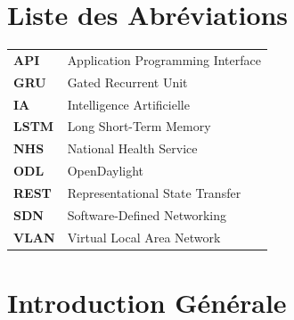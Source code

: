 \documentclass[12pt,a4paper]{article}
\begin{document}
\newpage
\section*{Liste des Abréviations}

\begin{tabular}{ll}
\textbf{API} & Application Programming Interface \\
\textbf{GRU} & Gated Recurrent Unit \\
\textbf{IA}  & Intelligence Artificielle \\
\textbf{LSTM} & Long Short-Term Memory \\
\textbf{NHS} & National Health Service \\
\textbf{ODL} & OpenDaylight \\
\textbf{REST} & Representational State Transfer \\
\textbf{SDN} & Software-Defined Networking \\
\textbf{VLAN} & Virtual Local Area Network \\

\end{tabular}

\newpage
{}

\section{Introduction Générale}
\end{document}
